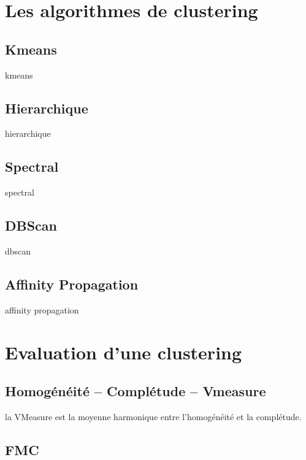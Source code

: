 \Annexes

\label{annex:A_ANNEXE_THEORIQUE}

	\minitoc

    \section{Les algorithmes de clustering }

        \subsection{Kmeans}
        kmeans 

        \subsection{Hierarchique}
        hierarchique 

        \subsection{Spectral}
        spectral 

        \subsection{DBScan}
        dbscan 

        \subsection{Affinity Propagation}
        affinity propagation 


    \section{Evaluation d’une clustering}

        \subsection{Homogénéité – Complétude – Vmeasure}
        la VMeasure  est la moyenne harmonique entre l'homogénéité et la complétude.
        
        \subsection{FMC}

